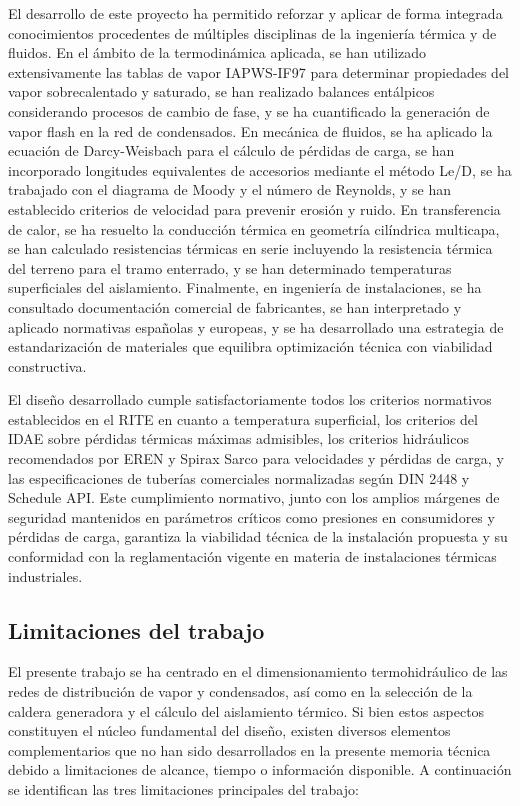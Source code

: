\documentclass[12pt]{article}
\begin{document}
El desarrollo de este proyecto ha permitido reforzar y aplicar de forma integrada conocimientos procedentes de múltiples disciplinas de la ingeniería térmica y de fluidos. En el ámbito de la termodinámica aplicada, se han utilizado extensivamente las tablas de vapor IAPWS-IF97 para determinar propiedades del vapor sobrecalentado y saturado, se han realizado balances entálpicos considerando procesos de cambio de fase, y se ha cuantificado la generación de vapor flash en la red de condensados. En mecánica de fluidos, se ha aplicado la ecuación de Darcy-Weisbach para el cálculo de pérdidas de carga, se han incorporado longitudes equivalentes de accesorios mediante el método Le/D, se ha trabajado con el diagrama de Moody y el número de Reynolds, y se han establecido criterios de velocidad para prevenir erosión y ruido. En transferencia de calor, se ha resuelto la conducción térmica en geometría cilíndrica multicapa, se han calculado resistencias térmicas en serie incluyendo la resistencia térmica del terreno para el tramo enterrado, y se han determinado temperaturas superficiales del aislamiento. Finalmente, en ingeniería de instalaciones, se ha consultado documentación comercial de fabricantes, se han interpretado y aplicado normativas españolas y europeas, y se ha desarrollado una estrategia de estandarización de materiales que equilibra optimización técnica con viabilidad constructiva.

El diseño desarrollado cumple satisfactoriamente todos los criterios normativos establecidos en el RITE en cuanto a temperatura superficial, los criterios del IDAE sobre pérdidas térmicas máximas admisibles, los criterios hidráulicos recomendados por EREN y Spirax Sarco para velocidades y pérdidas de carga, y las especificaciones de tuberías comerciales normalizadas según DIN 2448 y Schedule API. Este cumplimiento normativo, junto con los amplios márgenes de seguridad mantenidos en parámetros críticos como presiones en consumidores y pérdidas de carga, garantiza la viabilidad técnica de la instalación propuesta y su conformidad con la reglamentación vigente en materia de instalaciones térmicas industriales.

\subsection{Limitaciones del trabajo}
\label{subsec:limitaciones}

El presente trabajo se ha centrado en el dimensionamiento termohidráulico de las redes de distribución de vapor y condensados, así como en la selección de la caldera generadora y el cálculo del aislamiento térmico. Si bien estos aspectos constituyen el núcleo fundamental del diseño, existen diversos elementos complementarios que no han sido desarrollados en la presente memoria técnica debido a limitaciones de alcance, tiempo o información disponible. A continuación se identifican las tres limitaciones principales del trabajo:
\end{document}
